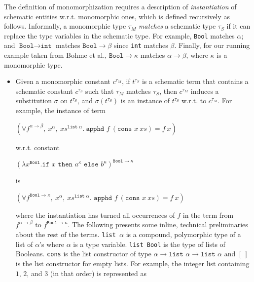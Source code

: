 \documentclass{article}
\begin{document}
	The definition of monomorphization 
	requires a description of 
	\textit{instantiation} of schematic 
	entities w.r.t. 
	monomorphic ones, which is defined
	recursively as follows.
	Informally, a monomorphic type 
	$\tau_M$ \textit{matches} a schematic 
	type $\tau_S$ if it can replace the 
	type variables in the schematic 
	type. For example, \texttt{Bool} 
	matches $\alpha$; and $\texttt{Bool} 
	\to \texttt{int}$ matches 
	$\texttt{Bool} \to \beta$
	since \texttt{int} matches 
	$\beta$. Finally, for our running 
	example taken from Bohme et al., 
	${\texttt{Bool} \to \kappa}$
	matches $\alpha \to \beta$,
	where $\kappa$ is a monomorphic
	type.
	\begin{itemize}
	\item Given a monomorphic constant 
		$c^{\tau_M}$,  if $t^{\tau_S}$ is a 
		schematic term that contains a 
		schematic constant $c^{\tau_S}$ 
		such that $\tau_M$ matches 
		$\tau_S$, then $c^{\tau_M}$ induces 
		a substitution $\sigma$ on $t^{\tau_S}$, 
		and $\sigma(t^{\tau_S})$ is an instance of 
		$t^{\tau_S}$ w.r.t. to $c^{\tau_M}$. 
		For example, the instance of term
		\begin{center}
			$(\forall f^{\alpha \to \beta},\ 
			x^{\alpha},\ xs^{\texttt{list }
				\alpha}.\ \texttt{apphd }f\ 
			(\texttt{cons }x\ xs) = f\ x)$
		\end{center} 
		w.r.t. constant
		\begin{center}
			$(\lambda x^{\texttt{Bool}}.
			\texttt{if }x\texttt{ then }
			a^{\kappa} \texttt{ else }
			b^{\kappa})^{\texttt{Bool} \to 
				\kappa}$ 
		\end{center}
		is
		\begin{center}
			$(\forall f^{\texttt{Bool} 
				\to \kappa},\ x^{\alpha},\ 
			xs^{\texttt{list }\alpha}. 
			\texttt{ apphd }f\ (\texttt{cons }
			x \ xs) = f\ x)$
		\end{center}
		where the instantiation 
		has turned all occurrences of $f$ 
		in the term from $f^{\alpha \to \beta}$ 
		to $f^{\texttt{Bool} \to \kappa}$.
		The following presents some inline, 
		technical preliminaries about 
		the rest of the terms.
		\texttt{list $\alpha$} is a compound,
		polymorphic type of a list of 
		$\alpha$'s where $\alpha$ is a type 
		variable. \texttt{list Bool} is the 
		type of lists of Booleans. \texttt{cons} 
		is the list constructor of type 
		$\alpha \to \texttt{list }\alpha \to 
		\texttt{list }\alpha$ and $[\ ]$ is 
		the list constructor for empty lists. 
		For example, the integer list 
		containing $1$, $2$, and $3$ (in that 
		order) is represented as 

\end{itemize}
\end{document}
